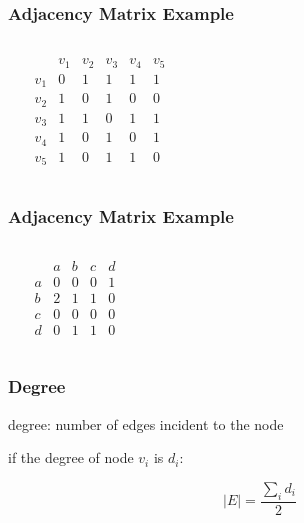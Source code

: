 \documentclass[dvipsnames]{beamer}
\begin{document}
\begin{frame}
  \frametitle{Adjacency Matrix Example}

  \begin{example}
    \begin{columns}
      \begin{center}
      \end{center}

      \[
        \begin{array}{c|ccccc}
                & v_1 & v_2 & v_3 & v_4 & v_5\\\hline
            v_1 & 0 & 1 & 1 & 1 & 1\\
            v_2 & 1 & 0 & 1 & 0 & 0\\
            v_3 & 1 & 1 & 0 & 1 & 1\\
            v_4 & 1 & 0 & 1 & 0 & 1\\
            v_5 & 1 & 0 & 1 & 1 & 0
        \end{array}
      \]
    \end{columns}
  \end{example}
\end{frame}

\begin{frame}
  \frametitle{Adjacency Matrix Example}

  \begin{example}
    \begin{columns}
    \begin{center}
    \end{center}

      \[
        \begin{array}{c|cccc}
              & a & b & c & d\\\hline
            a & 0 & 0 & 0 & 1\\
            b & 2 & 1 & 1 & 0\\
            c & 0 & 0 & 0 & 0\\
            d & 0 & 1 & 1 & 0
        \end{array}
      \]
    \end{columns}
  \end{example}
\end{frame}

\begin{frame}
  \frametitle{Degree}

  \begin{definition}
    \alert{degree}: number of edges incident to the node
  \end{definition}

  \pause
  \begin{theorem}
    if the degree of node $v_i$ is $d_i$:

    \[ |E| = \frac{\sum_i d_i}{2} \]
  \end{theorem}
\end{frame}
\end{document}
